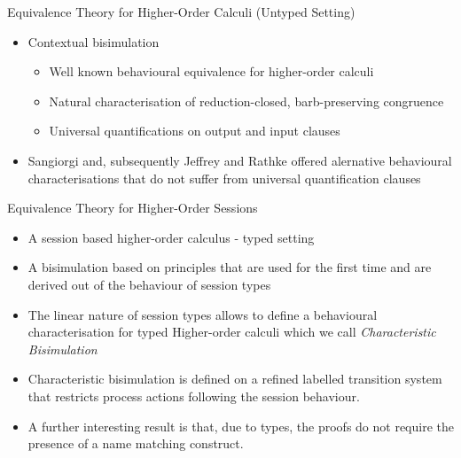 \documentclass{beamer}
\begin{document}
	\begin{frame}{Equivalence Theory for Higher-Order Calculi (Untyped Setting)}
		\begin{itemize}
			\item	Contextual bisimulation
				\begin{itemize}
					\item	Well known behavioural equivalence for higher-order calculi
					\item	Natural characterisation of reduction-closed, barb-preserving congruence
					\item	Universal quantifications on output and input clauses
				\end{itemize}


			\item	Sangiorgi and, subsequently Jeffrey and Rathke offered alernative behavioural characterisations
				that do not suffer from universal quantification clauses
		\end{itemize}
	\end{frame}

	\begin{frame}{Equivalence Theory for Higher-Order Sessions}
		\begin{itemize}
			\item	A session based higher-order calculus - typed setting

			\item	A bisimulation based on principles that are
				used for the first time and are derived out of the behaviour of session types

			\item	The linear nature of session types allows to define
				a behavioural characterisation for typed Higher-order calculi
				which we call {\em Characteristic Bisimulation}

			\item	Characteristic bisimulation is defined on a refined labelled transition system
				that restricts process actions following the session behaviour.

			\item	A further interesting result is that, due to types, the proofs do
				not require the presence of a name matching construct.
		\end{itemize}
	\end{frame}
\end{document}
